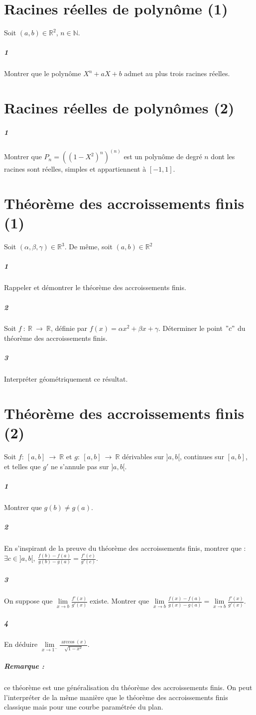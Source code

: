 \documentclass[10pt,a4paper]{article}
\begin{document}
\section{Racines réelles de polynôme (1)}
Soit $(a,b) \in \mathbb{R}^2$, $n \in \mathbb{N}$.
\subparagraph{1}Montrer que le polynôme $X^n+aX+b$ admet au plus trois racines réelles.

\section{Racines réelles de polynômes (2)}
\subparagraph{1}Montrer que $P_n=((1-X^2)^n)^{(n)}$ est un polynôme de degré $n$ dont les racines sont réelles, simples et appartiennent à $[-1,1]$.

\section{Théorème des accroissements finis (1)}
Soit $(\alpha,\beta,\gamma) \in \mathbb{R}^3$. De même, soit $(a,b) \in \mathbb{R}^2$
\subparagraph{1}Rappeler et démontrer le théorème des accroissements finis.
\subparagraph{2}Soit $f \ : \ \mathbb{R} \ \rightarrow \ \mathbb{R}$, définie par $f(x)=\alpha x^2+\beta x +\gamma$. Déterminer le point $"c"$ du théorème des accroissements finis.
\subparagraph{3}Interpréter géométriquement ce résultat.

\section{Théorème des accroissements finis (2)}
Soit $f: \ [a,b] \ \rightarrow \ \mathbb{R}$ et $g: \ [a,b] \ \rightarrow \ \mathbb{R}$ dérivables sur $]a,b[$, continues sur $[a,b]$, et telles que $g'$ ne s'annule pas sur $]a,b[$.
\subparagraph{1}Montrer que $g(b) \neq g(a)$.
\subparagraph{2}En s'inspirant de la preuve du théorème des accroissements finis, montrer que : $\exists c \in ]a,b[, \ \frac{f(b)-f(a)}{g(b)-g(a)}=\frac{f'(c)}{g'(c)}$.
\subparagraph{3}On suppose que $\underset{x \rightarrow b}{\lim}\frac{f'(x)}{g'(x)}$ existe. Montrer que $\underset{x \rightarrow b}{\lim}\frac{f(x)-f(a)}{g(x)-g(a)}=\underset{x \rightarrow b}{\lim}\frac{f'(x)}{g'(x)}$.
\subparagraph{4}En déduire $\underset{x \rightarrow 1^-}{\lim} \frac{\arccos(x)}{\sqrt{1-x^2}}$.
\subparagraph{Remarque :} ce théorème est une généralisation du théorème des accroissements finis. On peut l'interpréter de la même manière que le théorème des accroissements finis classique mais pour une courbe paramétrée du plan.
 
\end{document}
